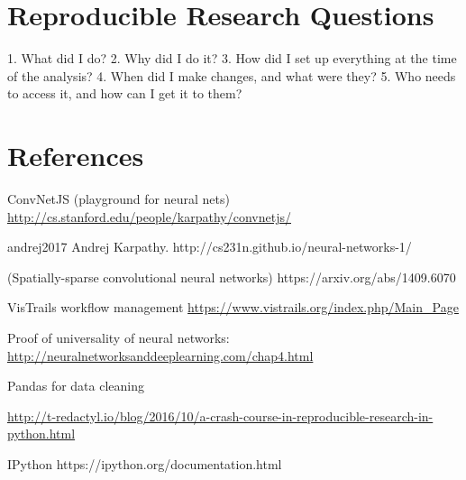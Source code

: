 \documentclass[12pt,letterpaper,boxed]{article}
\begin{document}
\section{Reproducible Research Questions}

1. What did I do?
2. Why did I do it?
3. How did I set up everything at the time of the analysis?
4. When did I make changes, and what were they?
5. Who needs to access it, and how can I get it to them?

\section{References}
ConvNetJS (playground for neural nets)
\url{http://cs.stanford.edu/people/karpathy/convnetjs/}

andrej2017
Andrej Karpathy. http://cs231n.github.io/neural-networks-1/

(Spatially-sparse convolutional neural networks) https://arxiv.org/abs/1409.6070

VisTrails workflow management
\url{https://www.vistrails.org/index.php/Main_Page}

Proof of universality of neural networks:
\url{http://neuralnetworksanddeeplearning.com/chap4.html}


Pandas for data cleaning

\url{http://t-redactyl.io/blog/2016/10/a-crash-course-in-reproducible-research-in-python.html}

IPython
https://ipython.org/documentation.html
\end{document}
